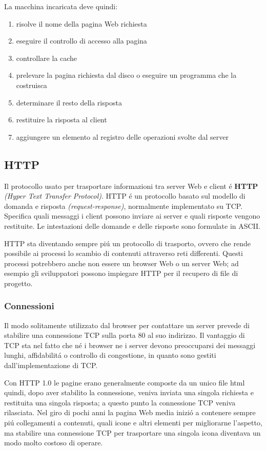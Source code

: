 \documentclass[12pt]{article}
\begin{document}
La macchina incaricata deve quindi:
\begin{enumerate}
	\item risolve il nome della pagina Web richiesta
	\item eseguire il controllo di accesso alla pagina
	\item controllare la cache
	\item prelevare la pagina richiesta dal disco o eseguire un programma che la costruisca
	\item determinare il resto della risposta
	\item restituire la risposta al client
	\item aggiungere un elemento al registro delle operazioni svolte dal server
\end{enumerate}

\subsection{HTTP}\label{web-http-http}
Il protocollo usato per trasportare informazioni tra server Web e client \'e \textbf{HTTP} \textit{(Hyper Text Transfer 
Protocol)}. HTTP \'e un protocollo basato sul modello di domanda e risposta \textit{(request-response)}, normalmente implementato 
su TCP. Specifica quali messaggi i client possono inviare ai server e quali risposte vengono restituite. Le intestazioni delle 
domande e delle risposte sono formulate in ASCII.

HTTP sta diventando sempre pi\'u un protocollo di trasporto, ovvero che rende possibile ai processi lo scambio di contenuti 
attraverso reti differenti. Questi processi potrebbero anche non essere un browser Web o un server Web; ad esempio gli 
sviluppatori possono impiegare HTTP per il recupero di file di progetto.

\subsubsection{Connessioni}\label{web-http-http-connessioni}
Il modo solitamente utilizzato dal browser per contattare un server prevede di stabilire una connessione TCP sulla porta 80 al 
suo indirizzo. Il vantaggio di TCP sta nel fatto che n\'e i browser ne i server devono preoccuparsi dei messaggi lunghi, 
affidabilit\'a o controllo di congestione, in quanto sono gestiti dall'implementazione di TCP.

Con HTTP 1.0 le pagine erano generalmente composte da un unico file html quindi, dopo aver stabilito la connessione, veniva inviata 
una singola richiesta e restituita una singola risposta; a questo punto la connessione TCP veniva rilasciata. Nel giro di pochi 
anni la pagina Web media inizi\'o a contenere sempre pi\'u collegamenti a contenuti, quali icone e altri elementi per migliorarne 
l'aspetto, ma stabilire una connessione TCP per trasportare una singola icona diventava un modo molto costoso di operare.
\end{document}
